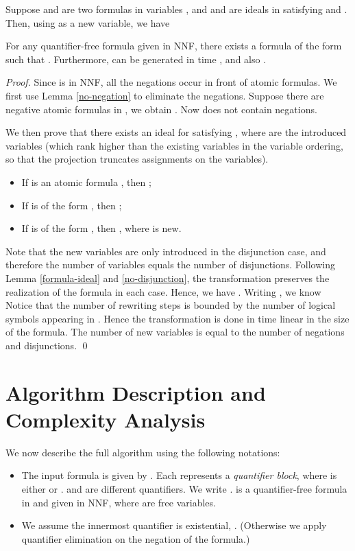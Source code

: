 \documentclass[envcountsect]{llncs}
\begin{document}
\begin{lemma}\label{no-disjunction}
Suppose  and  are two formulas in variables , and  and  are ideals in  satisfying  and . Then, using  as a new variable, we have 
\end{lemma}



\begin{theorem}
For any quantifier-free formula  given in NNF, there exists a formula  of the form  such that . Furthermore,  can be generated in time , and also .
\label{flatten-theorem}
\end{theorem}
\begin{proof}
Since  is in NNF, all the negations occur in front of atomic formulas. We first use Lemma \ref{no-negation} to eliminate the negations. Suppose there are  negative atomic formulas in , we obtain . Now  does not contain negations.

We then prove that there exists an ideal  for  satisfying , where  are the introduced variables (which rank higher than the existing variables in the variable ordering, so that the projection  truncates assignments on the  variables).
\begin{itemize}
\item If  is an atomic formula , then ;

\item If  is of the form , then ;

\item If  is of the form , then , where  is new.
\end{itemize}
Note that the new variables are only introduced in the disjunction case, and therefore the number of  variables equals the number of disjunctions. Following Lemma \ref{formula-ideal} and \ref{no-disjunction}, the transformation preserves the realization of the formula in each case. Hence, we have . Writing , we know  Notice that the number of rewriting steps is bounded by the number of logical symbols appearing in . Hence the transformation is done in time linear in the size of the formula. The number of new variables is equal to the number of negations and disjunctions. 
\qed
\end{proof}

\section{Algorithm Description and Complexity Analysis}

We now describe the full algorithm using the following notations:
\begin{itemize}
\item The input formula is given by . Each  represents a {\em quantifier block}, where  is either  or .  and  are different quantifiers. We write .  is a quantifier-free formula in  and  given in NNF, where  are free variables. 
\item We assume the innermost quantifier is existential, . (Otherwise we apply quantifier elimination on the negation of the formula.)
\end{itemize}
\end{document}
